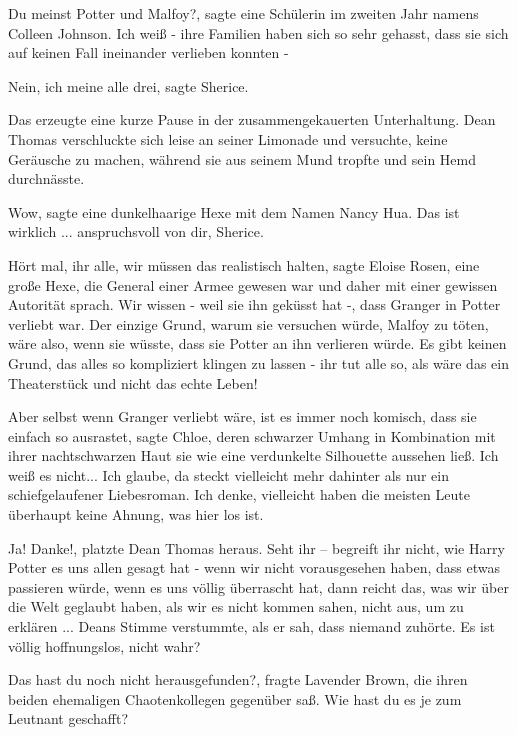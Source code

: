 \glqq Du meinst Potter und Malfoy?\grqq{}, sagte eine Schülerin im zweiten Jahr
namens Colleen Johnson. \glqq Ich weiß - ihre Familien haben sich so sehr
gehasst, dass sie sich auf keinen Fall ineinander verlieben konnten -\grqq{}

\glqq Nein, ich meine alle drei\grqq{}, sagte Sherice.

Das erzeugte eine kurze Pause in der zusammengekauerten Unterhaltung. Dean
Thomas verschluckte sich leise an seiner Limonade und versuchte, keine Geräusche
zu machen, während sie aus seinem Mund tropfte und sein Hemd durchnässte.

\glqq Wow\grqq{}, sagte eine dunkelhaarige Hexe mit dem Namen Nancy Hua. \glqq
Das ist wirklich ... anspruchsvoll von dir, Sherice.\grqq{}

\glqq Hört mal, ihr alle, wir müssen das realistisch halten\grqq{}, sagte Eloise
Rosen, eine große Hexe, die General einer Armee gewesen war und daher mit einer
gewissen Autorität sprach. \glqq Wir wissen - weil sie ihn geküsst hat -, dass
Granger in Potter verliebt war. Der einzige Grund, warum sie versuchen würde,
Malfoy zu töten, wäre also, wenn sie wüsste, dass sie Potter an ihn verlieren
würde. Es gibt keinen Grund, das alles so kompliziert klingen zu lassen - ihr
tut alle so, als wäre das ein Theaterstück und nicht das echte Leben!\grqq{}

\glqq Aber selbst wenn Granger verliebt wäre, ist es immer noch komisch, dass
sie einfach so ausrastet\grqq{}, sagte Chloe, deren schwarzer Umhang in
Kombination mit ihrer nachtschwarzen Haut sie wie eine verdunkelte Silhouette
aussehen ließ. \glqq Ich weiß es nicht... Ich glaube, da steckt vielleicht mehr
dahinter als nur ein schiefgelaufener Liebesroman. Ich denke, vielleicht haben
die meisten Leute überhaupt keine Ahnung, was hier los ist.\grqq{}

\glqq Ja! Danke!\grqq{}, platzte Dean Thomas heraus. \glqq Seht ihr – begreift
ihr nicht, wie Harry Potter es uns allen gesagt hat - wenn wir nicht
vorausgesehen haben, dass etwas passieren würde, wenn es uns völlig überrascht
hat, dann reicht das, was wir über die Welt geglaubt haben, als wir es nicht
kommen sahen, nicht aus, um zu erklären ...\grqq{} Deans Stimme verstummte, als
er sah, dass niemand zuhörte. \glqq Es ist völlig hoffnungslos, nicht
wahr?\grqq{}

\glqq Das hast du noch nicht herausgefunden?\grqq{}, fragte Lavender Brown, die
ihren beiden ehemaligen Chaotenkollegen gegenüber saß. \glqq Wie hast du es je
zum Leutnant geschafft?\grqq{}

